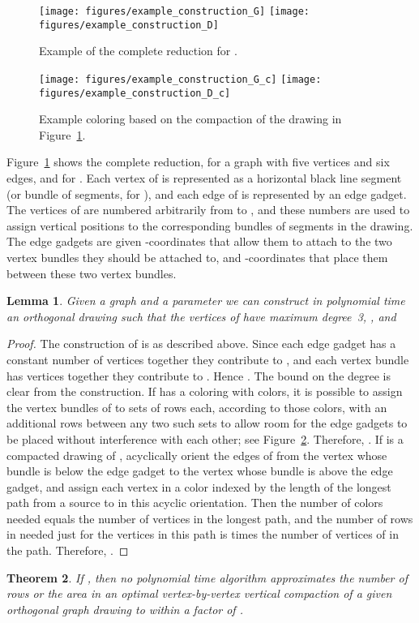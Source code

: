 \documentclass[12pt]{article}
\newtheorem{theorem}{Theorem}
\newtheorem{lemma}[theorem]{Lemma}
\theoremstyle{definitions}
\begin{document}
\begin{figure}[t]
\centering
\texttt{[image: figures/example\_construction\_G]}\hfill
\texttt{[image: figures/example\_construction\_D]}
\caption{Example of the complete reduction for .}
\label{fig:vvredux}
\end{figure}

\begin{figure}[t]
\centering
\texttt{[image: figures/example\_construction\_G\_c]}\hfill
\texttt{[image: figures/example\_construction\_D\_c]}
\caption{Example coloring based on the compaction of the drawing in Figure~\ref{fig:vvredux}.}
\label{fig:vvredux-c}
\end{figure}

Figure~\ref{fig:vvredux} shows the complete reduction, for a graph  with five vertices and six edges, and for . Each vertex of  is represented as a horizontal black line segment (or bundle of segments, for ), and each edge of  is represented by an edge gadget. The vertices of  are numbered arbitrarily from  to , and these numbers are used to assign vertical positions to the corresponding bundles of segments in the drawing. The edge gadgets are given -coordinates that allow them to attach to the two vertex bundles they should be attached to, and -coordinates that place them between these two vertex bundles.

\begin{lemma}
\label{unrestricted lemma}
Given a graph  and a parameter  we can construct in polynomial time an orthogonal drawing  such that the vertices of  have maximum degree~3, , and

\end{lemma}
\begin{proof}
The construction of  is as described above. Since each edge gadget has a constant number of vertices together they contribute  to , and each vertex bundle has  vertices together they contribute  to . Hence . The bound on the degree is clear from the construction. If  has a coloring with  colors, it is possible to assign the vertex bundles of  to  sets of  rows each, according to those colors, with an additional  rows between any two such sets to allow room for the edge gadgets to be placed without interference with each other; see Figure~\ref{fig:vvredux-c}. Therefore, .
If  is a compacted drawing of , acyclically orient the edges of  from the vertex whose bundle is below the edge gadget to the vertex whose bundle is above the edge gadget, and assign each vertex  in  a color indexed by the length of the longest path from a source to  in this acyclic orientation. Then the number of colors needed equals the number of vertices in the longest path, and the number of rows in  needed just for the vertices in this path is  times the number of vertices of  in the path. Therefore, .
\end{proof}
\begin{theorem}
If , then no polynomial time algorithm approximates the number of
rows or the area in an optimal vertex-by-vertex vertical compaction of a given orthogonal graph drawing to within a factor of .
\end{theorem}
\end{document}
